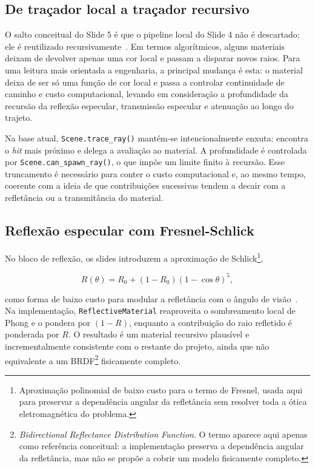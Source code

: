 \documentclass[portuguese]{sbcreviews-2025}%
\makeatletter
\newcommand{\slideurl}[1]{%
    \ifcsname slideurl@#1\endcsname
        \csname slideurl@#1\endcsname
    \else
        #1
    \fi
}
\newcommand{\slidescite}[2]{\citep[\href{\slideurl{#1}}{pp.~#2}]{#1}}
\makeatother
\begin{document}
\subsection{De traçador local a traçador recursivo}
\label{sec:recursivo-v3}

O salto conceitual do Slide 5 é que o pipeline local do Slide 4 não é descartado; ele é reutilizado recursivamente~\slidescite{inf2608slides05}{26--35}. Em termos algorítmicos, alguns materiais deixam de devolver apenas uma cor local e passam a disparar novos raios. Para uma leitura mais orientada a engenharia, a principal mudança é esta: o material deixa de ser só uma função de cor local e passa a controlar continuidade de caminho e custo computacional, levando em consideração a profundidade da recursão da reflexão especular, transmissão especular e atenuação ao longo do trajeto.

Na base atual, \texttt{Scene.trace\_ray()} mantém-se intencionalmente enxuta: encontra o \emph{hit} mais próximo e delega a avaliação ao material. A profundidade é controlada por \texttt{Scene.can\_spawn\_ray()}, o que impõe um limite finito à recursão. Esse truncamento é necessário para conter o custo computacional e, ao mesmo tempo, coerente com a ideia de que contribuições sucessivas tendem a decair com a refletância ou a transmitância do material.

\subsection{Reflexão especular com Fresnel-Schlick}
\label{sec:fresnel-v3}

No bloco de reflexão, os slides introduzem a aproximação de Schlick\footnote{Aproximação polinomial de baixo custo para o termo de Fresnel, usada aqui para preservar a dependência angular da refletância sem resolver toda a ótica eletromagnética do problema.},

\[
R(\theta)=R_0 + (1-R_0)(1-\cos\theta)^5,
\]

como forma de baixo custo para modular a refletância com o ângulo de visão~\slidescite{inf2608slides05}{26--28}. Na implementação, \texttt{ReflectiveMaterial} reaproveita o sombreamento local de Phong e o pondera por \((1-R)\), enquanto a contribuição do raio refletido é ponderada por \(R\). O resultado é um material recursivo plausível e incrementalmente consistente com o restante do projeto, ainda que não equivalente a um BRDF\footnote{\emph{Bidirectional Reflectance Distribution Function}. O termo aparece aqui apenas como referência conceitual: a implementação preserva a dependência angular da refletância, mas não se propõe a cobrir um modelo fisicamente completo.} fisicamente completo.
\end{document}
